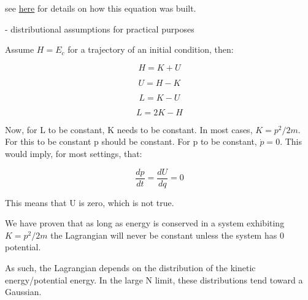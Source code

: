 \documentclass{article}
\begin{document}
see \href{http://www.physics.hmc.edu/~saeta/courses/p111/uploads/Y2013/lec131023-DSHO.pdf}{here} for details on how this equation was built. 

- distributional assumptions for practical purposes

Assume $ H = E_c $ for a trajectory of an initial condition, then:

$$ H = K + U $$

$$U = H - K $$

$$ L = K - U $$

$$ L = 2K -H $$

Now, for L to be constant, K needs to be constant. In most cases, $ K = p^2/2m $. For this to be constant p should be constant. For p to be constant, $\dot{p} = 0$. This would imply, for most settings, that:

$$ \frac{dp}{dt} = \frac{dU}{dq} = 0 $$

This means that U is zero, which is not true.

We have proven that as long as energy is conserved in a system exhibiting $K = p^2/2m$ the Lagrangian will never be constant unless the system has 0 potential. 

As such, the Lagrangian depends on the distribution of the kinetic energy/potential energy. In the large N limit, these distributions tend toward a Gaussian.
\end{document}
